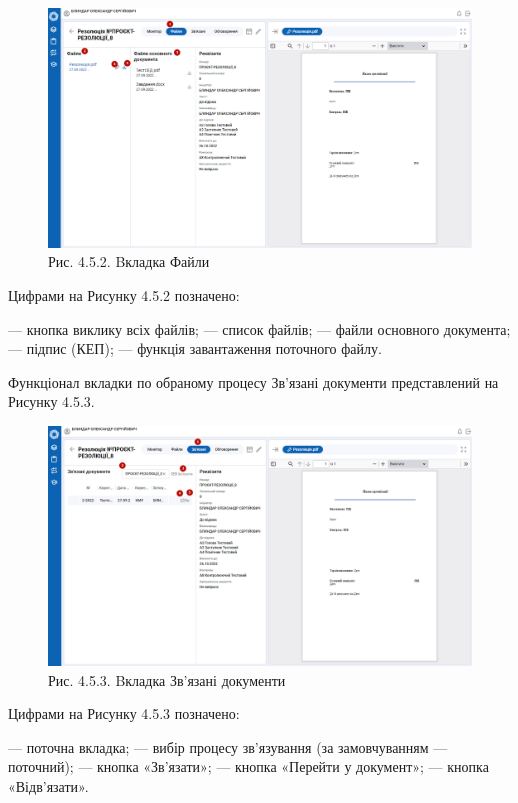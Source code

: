 \begin{figure}[!htbp]
\centerline{\includegraphics[width=\textwidth]{img/4.5.2.png}}
\caption{Рис. 4.5.2. Bкладка Файли}
\end{figure}

Цифрами на Рисунку 4.5.2 позначено:

 --- кнопка виклику всіх файлів;
 --- список файлів;
 --- файли основного документа;
 --- підпис (КЕП);
 --- функція завантаження поточного файлу.

Функціонал вкладки по обраному процесу Зв’язані документи представлений на
Рисунку 4.5.3.

\begin{figure}[!htbp]
\centerline{\includegraphics[width=\textwidth]{img/4.5.3.png}}
\caption{Рис. 4.5.3. Bкладка Зв'язані документи}
\end{figure}

Цифрами на Рисунку 4.5.3 позначено:

 --- поточна вкладка;
 --- вибір процесу зв’язування (за замовчуванням --- поточний);
 --- кнопка «Зв’язати»;
 --- кнопка «Перейти у документ»;
 --- кнопка «Відв’язати».

